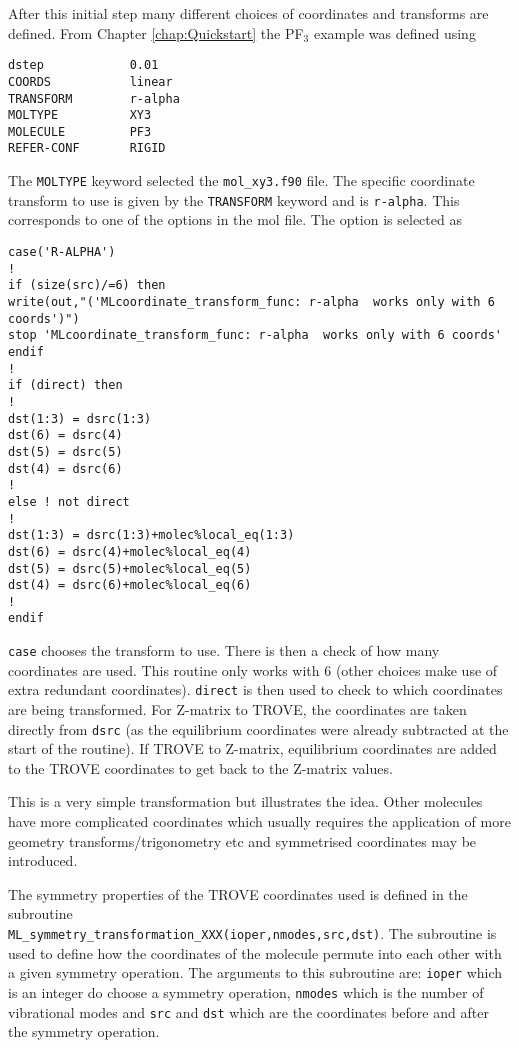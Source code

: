 After this initial step many different choices of coordinates and transforms are defined. From Chapter \ref{chap:Quickstart}
the PF$_3$ example was defined using
\begin{verbatim}
dstep            0.01
COORDS           linear
TRANSFORM        r-alpha
MOLTYPE          XY3
MOLECULE         PF3
REFER-CONF       RIGID
\end{verbatim}
The \verb|MOLTYPE| keyword selected the  \verb|mol_xy3.f90| file. The specific coordinate transform to use is given by the 
\verb|TRANSFORM| keyword and is \verb|r-alpha|. This corresponds to one of the options in the mol file. The option is 
selected as
\begin{verbatim}
case('R-ALPHA')
!
if (size(src)/=6) then
write(out,"('MLcoordinate_transform_func: r-alpha  works only with 6 coords')")
stop 'MLcoordinate_transform_func: r-alpha  works only with 6 coords'
endif
!
if (direct) then
!
dst(1:3) = dsrc(1:3)
dst(6) = dsrc(4)
dst(5) = dsrc(5)
dst(4) = dsrc(6)
!
else ! not direct
!
dst(1:3) = dsrc(1:3)+molec%local_eq(1:3)
dst(6) = dsrc(4)+molec%local_eq(4)
dst(5) = dsrc(5)+molec%local_eq(5)
dst(4) = dsrc(6)+molec%local_eq(6)
!
endif
\end{verbatim}
\verb|case| chooses the transform to use. There is then a check of how many coordinates are used. This routine only
works with 6 (other choices make use of extra redundant coordinates). \verb|direct| is then used to check to which 
coordinates are being transformed. For Z-matrix to TROVE, the coordinates are taken directly from \verb|dsrc| 
(as the equilibrium coordinates
were already subtracted at the start of the routine). If TROVE to Z-matrix, equilibrium coordinates are added to the TROVE
coordinates to get back to the Z-matrix values.

This is a very simple transformation but illustrates the idea. Other molecules have more complicated coordinates which
usually requires the application of more geometry transforms/trigonometry etc and symmetrised coordinates may be introduced.


The symmetry properties of the TROVE coordinates used is defined in the subroutine\\
\verb|ML_symmetry_transformation_XXX(ioper,nmodes,src,dst)|. The subroutine is used to define how the coordinates of the 
molecule permute into each other with a given symmetry operation. 
The arguments to this subroutine are: \verb|ioper| which is 
an integer do choose a symmetry operation, \verb|nmodes| which is the number of vibrational modes and \verb|src|
and \verb|dst| which are the coordinates before and after the symmetry operation. 

